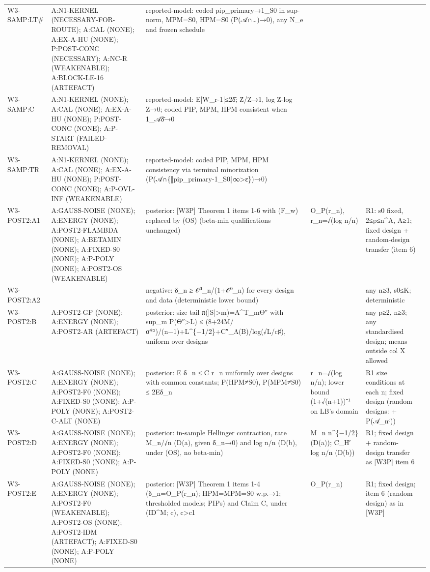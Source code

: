 \begin{longtable}{p{2.2cm}p{4.2cm}p{3cm}p{1.6cm}p{2.6cm}p{1.6cm}}
W3-SAMP:LT\# & A:N1-KERNEL (NECESSARY-FOR-ROUTE); A:CAL (NONE); A:EX-A-HU (NONE); P:POST-CONC (NECESSARY); A:NC-R (WEAKENABLE); A:BLOCK-LE-16 (ARTEFACT) & reported-model: coded pip\_primary→1\_S0 in sup-norm, MPM=S0, HPM=S0 (P(𝒜∩…)→0), any N\_e and frozen schedule &  &  &  \\
W3-SAMP:C & A:N1-KERNEL (NONE); A:CAL (NONE); A:EX-A-HU (NONE); P:POST-CONC (NONE); A:P-START (FAILED-REMOVAL) & reported-model: E|W\_r-1|≤2δ̄; Ẑ/Z→1, log Ẑ-log Z→0; coded PIP, MPM, HPM consistent when 1\_𝒜δ̄→0 &  &  &  \\
W3-SAMP:TR & A:N1-KERNEL (NONE); A:CAL (NONE); A:EX-A-HU (NONE); P:POST-CONC (NONE); A:P-OVL-INF (WEAKENABLE) & reported-model: coded PIP, MPM, HPM consistency via terminal minorization (P(𝒜∩\{‖pip\_primary-1\_S0‖∞>ε\})→0) &  &  &  \\
W3-POST2:A1 & A:GAUSS-NOISE (NONE); A:ENERGY (NONE); A:POST2-FLAMBDA (NONE); A:BETAMIN (NONE); A:FIXED-S0 (NONE); A:P-POLY (NONE); A:POST2-OS (WEAKENABLE) & posterior: [W3P] Theorem 1 items 1-6 with (F\_w) replaced by (OS) (beta-min qualifications unchanged) & O\_P(r\_n), r\_n=√(log n/n) & R1: s0 fixed, 2≤p≤n\^{}A, A≥1; fixed design + random-design transfer (item 6) &  \\
W3-POST2:A2 &  & negative: δ\_n ≥ 𝒪⁰\_n/(1+𝒪⁰\_n) for every design and data (deterministic lower bound) &  & any n≥3, s0≤K; deterministic &  \\
W3-POST2:B & A:POST2-GP (NONE); A:ENERGY (NONE); A:POST2-AR (ARTEFACT) & posterior: size tail π(|S|>m)=A\^{}T\_mΘ″ with sup\_m P(Θ″>L) ≤ (8+24M/σ*²)/(n−1)+L\^{}\{−1/2\}+C″\_Λ(B)/log(√L/c♯), uniform over designs &  & any p≥2, n≥3; any standardised design; means outside col X allowed &  \\
W3-POST2:C & A:GAUSS-NOISE (NONE); A:ENERGY (NONE); A:POST2-F0 (NONE); A:FIXED-S0 (NONE); A:P-POLY (NONE); A:POST2-C-ALT (NONE) & posterior: E δ\_n ≤ C r\_n uniformly over designs with common constants; P(HPM≠S0), P(MPM≠S0) ≤ 2Eδ\_n & r\_n=√(log n/n); lower bound (1+√(n+1))⁻¹ on LB's domain & R1 size conditions at each n; fixed design (random designs: + P(𝒜\_nᶜ)) &  \\
W3-POST2:D & A:GAUSS-NOISE (NONE); A:ENERGY (NONE); A:POST2-F0 (NONE); A:FIXED-S0 (NONE); A:P-POLY (NONE) & posterior: in-sample Hellinger contraction, rate M\_n/√n (D(a), given δ\_n→0) and log n/n (D(b), under (OS), no beta-min) & M\_n n\^{}\{−1/2\} (D(a)); C\_H′ log n/n (D(b)) & R1; fixed design + random-design transfer as [W3P] item 6 &  \\
W3-POST2:E & A:GAUSS-NOISE (NONE); A:ENERGY (NONE); A:POST2-F0 (WEAKENABLE); A:POST2-OS (NONE); A:POST2-IDM (ARTEFACT); A:FIXED-S0 (NONE); A:P-POLY (NONE) & posterior: [W3P] Theorem 1 items 1-4 (δ\_n=O\_P(r\_n); HPM=MPM=S0 w.p.→1; thresholded models; PIPs) and Claim C, under (ID\^{}M; c), c>c1 & O\_P(r\_n) & R1; fixed design; item 6 (random design) as in [W3P] &  \\

\end{longtable}
